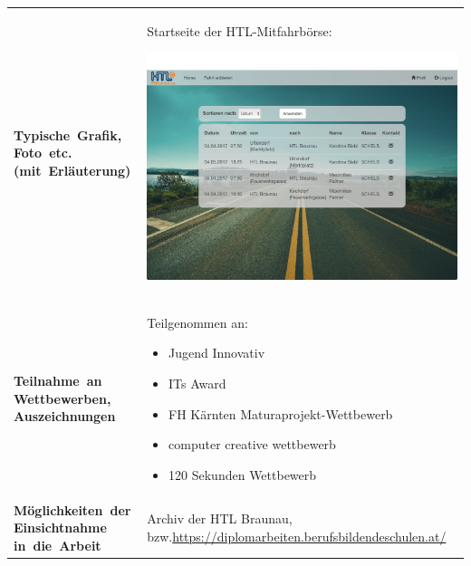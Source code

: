 \renewcommand{\arraystretch}{2}
\begin{tabularx}{1\textwidth}{ p{3.5cm} X }

\textbf{\mbox{Typische Grafik,} \mbox{Foto etc.} \mbox{(mit Erläuterung)}} & 
{
Startseite der HTL-Mitfahrbörse:
\begin{center}
	\includegraphics[width=1\linewidth]{media/images/typ_screen}
\end{center}
} \\

\textbf{\mbox{Teilnahme an} Wettbewerben, Auszeichnungen} & 
{
Teilgenommen an:
\begin{itemize}
\item Jugend Innovativ
\item ITs Award
\item FH Kärnten Maturaprojekt-Wettbewerb
\item computer creative wettbewerb
\item 120 Sekunden Wettbewerb
\end{itemize}
} \\

\textbf{\mbox{Möglichkeiten der} Einsichtnahme \mbox{in die Arbeit}} & 
{Archiv der HTL Braunau, bzw.\newline \url{https://diplomarbeiten.berufsbildendeschulen.at/}} \\


\end{tabularx}






